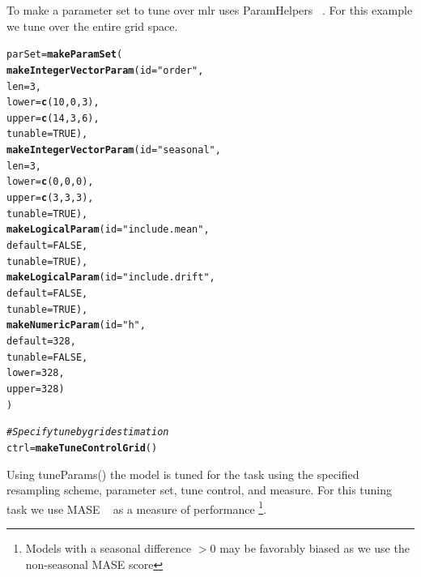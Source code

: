 \documentclass{article}\usepackage[]{graphicx}\usepackage[]{color}
\makeatletter
\newcommand{\hlnum}[1]{\textcolor[rgb]{0.686,0.059,0.569}{#1}}%
\newcommand{\hlstr}[1]{\textcolor[rgb]{0.192,0.494,0.8}{#1}}%
\newcommand{\hlcom}[1]{\textcolor[rgb]{0.678,0.584,0.686}{\textit{#1}}}%
\newcommand{\hlstd}[1]{\textcolor[rgb]{0.345,0.345,0.345}{#1}}%
\newcommand{\hlkwb}[1]{\textcolor[rgb]{0.69,0.353,0.396}{#1}}%
\newcommand{\hlkwc}[1]{\textcolor[rgb]{0.333,0.667,0.333}{#1}}%
\newcommand{\hlkwd}[1]{\textcolor[rgb]{0.737,0.353,0.396}{\textbf{#1}}}%
\newenvironment{kframe}{%
 \def\at@end@of@kframe{}%
 \ifinner\ifhmode%
  \def\at@end@of@kframe{\end{minipage}}%
  \begin{minipage}{\columnwidth}%
 \fi\fi%
 \def\FrameCommand##1{\hskip\@totalleftmargin \hskip-\fboxsep
 \colorbox{shadecolor}{##1}\hskip-\fboxsep
     \hskip-\linewidth \hskip-\@totalleftmargin \hskip\columnwidth}%
 \MakeFramed {\advance\hsize-\width
   \@totalleftmargin\z@ \linewidth\hsize
   \@setminipage}}%
 {\par\unskip\endMakeFramed%
 \at@end@of@kframe}
\newenvironment{knitrout}{}{} %
\theoremstyle{definition}
\newcommand\code{\@codex}
\def\@codex#1{{\normalfont\ttfamily\hyphenchar\font=-1 #1}}
\newcommand{\pkg}[1]{{\fontseries{b}\selectfont #1}}
\makeatother
\begin{document}
To make a parameter set to tune over \pkg{mlr} uses \pkg{ParamHelpers} ~\cite{paramhelper}. For this example we tune over the entire grid space. 
\begin{knitrout}
\color{fgcolor}\begin{kframe}
\begin{alltt}
\hlstd{parSet} \hlkwb{=} \hlkwd{makeParamSet}\hlstd{(}
  \hlkwd{makeIntegerVectorParam}\hlstd{(}\hlkwc{id} \hlstd{=} \hlstr{"order"}\hlstd{,}
                         \hlkwc{len} \hlstd{=} \hlnum{3}\hlstd{,}
                         \hlkwc{lower} \hlstd{=} \hlkwd{c}\hlstd{(}\hlnum{10}\hlstd{,}\hlnum{0}\hlstd{,}\hlnum{3}\hlstd{),}
                         \hlkwc{upper} \hlstd{=} \hlkwd{c}\hlstd{(}\hlnum{14}\hlstd{,}\hlnum{3}\hlstd{,}\hlnum{6}\hlstd{),}
                         \hlkwc{tunable} \hlstd{=} \hlnum{TRUE}\hlstd{),}
  \hlkwd{makeIntegerVectorParam}\hlstd{(}\hlkwc{id} \hlstd{=} \hlstr{"seasonal"}\hlstd{,}
                         \hlkwc{len} \hlstd{=} \hlnum{3}\hlstd{,}
                         \hlkwc{lower} \hlstd{=} \hlkwd{c}\hlstd{(}\hlnum{0}\hlstd{,}\hlnum{0}\hlstd{,}\hlnum{0}\hlstd{),}
                         \hlkwc{upper} \hlstd{=} \hlkwd{c}\hlstd{(}\hlnum{3}\hlstd{,}\hlnum{3}\hlstd{,}\hlnum{3}\hlstd{),}
                         \hlkwc{tunable} \hlstd{=} \hlnum{TRUE}\hlstd{),}
  \hlkwd{makeLogicalParam}\hlstd{(}\hlkwc{id} \hlstd{=} \hlstr{"include.mean"}\hlstd{,}
                   \hlkwc{default} \hlstd{=} \hlnum{FALSE}\hlstd{,}
                   \hlkwc{tunable} \hlstd{=} \hlnum{TRUE}\hlstd{),}
  \hlkwd{makeLogicalParam}\hlstd{(}\hlkwc{id} \hlstd{=} \hlstr{"include.drift"}\hlstd{,}
                   \hlkwc{default} \hlstd{=} \hlnum{FALSE}\hlstd{,}
                   \hlkwc{tunable} \hlstd{=} \hlnum{TRUE}\hlstd{),}
  \hlkwd{makeNumericParam}\hlstd{(}\hlkwc{id} \hlstd{=} \hlstr{"h"}\hlstd{,}
                   \hlkwc{default} \hlstd{=} \hlnum{328}\hlstd{,}
                   \hlkwc{tunable} \hlstd{=} \hlnum{FALSE}\hlstd{,}
                   \hlkwc{lower} \hlstd{=} \hlnum{328}\hlstd{,}
                   \hlkwc{upper} \hlstd{=} \hlnum{328}\hlstd{)}
\hlstd{)}

\hlcom{#Specify tune by grid estimation}
\hlstd{ctrl} \hlkwb{=} \hlkwd{makeTuneControlGrid}\hlstd{()}
\end{alltt}
\end{kframe}
\end{knitrout}

Using \code{tuneParams()} the model is tuned for the task using the specified resampling scheme, parameter set, tune control, and measure. For this tuning task we use MASE ~\cite{Hyndman2006} as a measure of performance \footnote{Models with a seasonal difference $> 0$ may be favorably biased as we use the non-seasonal MASE score}.
\end{document}
